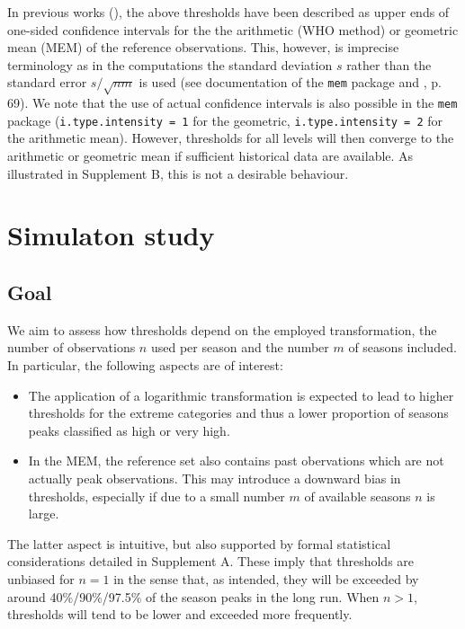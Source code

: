 \documentclass{article}
\newcommand{\sd}{s}
\begin{document}
In previous works (\citealt{WHO2014, Vega2015}), the above thresholds have been described as upper ends of one-sided confidence intervals for the the arithmetic (WHO method) or geometric mean (MEM) of the reference observations. This, however, is imprecise terminology as in the computations the standard deviation $\sd$ rather than the standard error $\sd/\sqrt{nm}$ is used (see documentation of the \texttt{mem} package and \citealt{WHO2014}, p. 69). We note that the use of actual confidence intervals is also possible in the \texttt{mem} package (\texttt{i.type.intensity = 1} for the geometric, \texttt{i.type.intensity = 2} for the arithmetic mean). However, thresholds for all levels will then converge to the arithmetic or geometric mean if sufficient historical data are available. As illustrated in Supplement B, this is not a desirable behaviour.
 

\section{Simulaton study}
\label{sec:simulation}

\subsection{Goal}

We aim to assess how thresholds depend on the employed transformation, the number of observations $n$ used per season and the number $m$ of seasons included. In particular, the following aspects are of interest:

\begin{itemize}
\item The application of a logarithmic transformation is expected to lead to higher thresholds for the extreme categories and thus a lower proportion of seasons peaks classified as high or very high.
\item In the MEM, the reference set also contains past obervations which are not actually peak observations. This may introduce a downward bias in thresholds, especially if due to a small number $m$ of available seasons $n$ is large.
\end{itemize}
The latter aspect is intuitive, but also supported by formal statistical considerations detailed in Supplement A. These imply that thresholds are unbiased for $n = 1$ in the sense that, as intended, they will be exceeded by around 40\%/90\%/97.5\% of the season peaks in the long run. When $n > 1$, thresholds will tend to be lower and exceeded more frequently.
\end{document}

